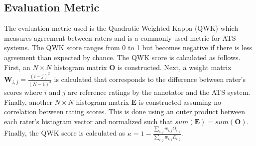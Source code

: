 \documentclass[letterpaper]{article}
\begin{document}
\subsection{Evaluation Metric}
 The evaluation metric used is the Quadratic Weighted Kappa (QWK) which measures agreement between raters and is a commonly used metric for ATS systems. The QWK score ranges from 0 to 1 but becomes negative if there is less agreement than expected by chance. The QWK score is calculated as follows. First, an $N \times N$ histogram matrix $\textbf{O}$ is constructed. Next, a weight matrix $\textbf{W}_{i,j} = \frac{(i-j)^2}{(N-1)^2}$ is calculated that corresponds to the difference between rater's scores where $i$ and $j$ are reference ratings by the annotator and the ATS system. Finally, another $N\times N$ histogram matrix $\textbf{E}$ is constructed assuming no correlation between rating scores. This is done using an outer product between each rater's histogram vector and normalized such that $sum(\textbf{E}) = sum(\textbf{O})$. Finally, the QWK score is calculated as $\kappa = 1 - \frac{\sum_{i,j}w_{i,j}O_{i,j}}{\sum_{i,j}w_{i,j}E_{i,j}}$. 
\end{document}
